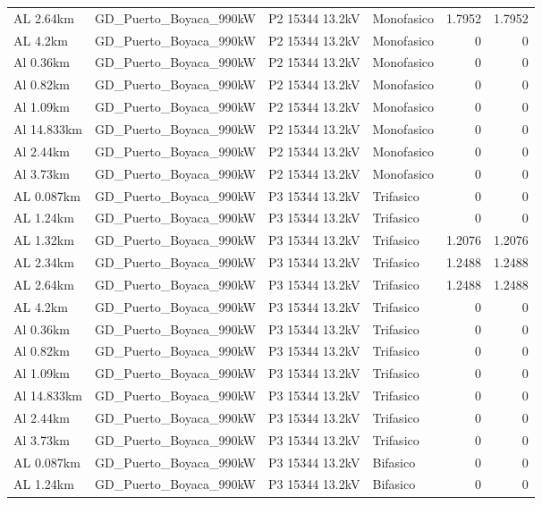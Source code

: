 \documentclass[11pt,a4paper]{article}
\begin{document}
\begin{longtable}{llllrr}
AL 2.64km & GD\_Puerto\_Boyaca\_990kW & P2 15344 13.2kV & Monofasico & 1.7952 & 1.7952 \\
AL 4.2km & GD\_Puerto\_Boyaca\_990kW & P2 15344 13.2kV & Monofasico & 0 & 0 \\
Al 0.36km & GD\_Puerto\_Boyaca\_990kW & P2 15344 13.2kV & Monofasico & 0 & 0 \\
Al 0.82km & GD\_Puerto\_Boyaca\_990kW & P2 15344 13.2kV & Monofasico & 0 & 0 \\
Al 1.09km & GD\_Puerto\_Boyaca\_990kW & P2 15344 13.2kV & Monofasico & 0 & 0 \\
Al 14.833km & GD\_Puerto\_Boyaca\_990kW & P2 15344 13.2kV & Monofasico & 0 & 0 \\
Al 2.44km & GD\_Puerto\_Boyaca\_990kW & P2 15344 13.2kV & Monofasico & 0 & 0 \\
Al 3.73km & GD\_Puerto\_Boyaca\_990kW & P2 15344 13.2kV & Monofasico & 0 & 0 \\
AL 0.087km & GD\_Puerto\_Boyaca\_990kW & P3 15344 13.2kV & Trifasico & 0 & 0 \\
AL 1.24km & GD\_Puerto\_Boyaca\_990kW & P3 15344 13.2kV & Trifasico & 0 & 0 \\
AL 1.32km & GD\_Puerto\_Boyaca\_990kW & P3 15344 13.2kV & Trifasico & 1.2076 & 1.2076 \\
AL 2.34km & GD\_Puerto\_Boyaca\_990kW & P3 15344 13.2kV & Trifasico & 1.2488 & 1.2488 \\
AL 2.64km & GD\_Puerto\_Boyaca\_990kW & P3 15344 13.2kV & Trifasico & 1.2488 & 1.2488 \\
AL 4.2km & GD\_Puerto\_Boyaca\_990kW & P3 15344 13.2kV & Trifasico & 0 & 0 \\
Al 0.36km & GD\_Puerto\_Boyaca\_990kW & P3 15344 13.2kV & Trifasico & 0 & 0 \\
Al 0.82km & GD\_Puerto\_Boyaca\_990kW & P3 15344 13.2kV & Trifasico & 0 & 0 \\
Al 1.09km & GD\_Puerto\_Boyaca\_990kW & P3 15344 13.2kV & Trifasico & 0 & 0 \\
Al 14.833km & GD\_Puerto\_Boyaca\_990kW & P3 15344 13.2kV & Trifasico & 0 & 0 \\
Al 2.44km & GD\_Puerto\_Boyaca\_990kW & P3 15344 13.2kV & Trifasico & 0 & 0 \\
Al 3.73km & GD\_Puerto\_Boyaca\_990kW & P3 15344 13.2kV & Trifasico & 0 & 0 \\
AL 0.087km & GD\_Puerto\_Boyaca\_990kW & P3 15344 13.2kV & Bifasico & 0 & 0 \\
AL 1.24km & GD\_Puerto\_Boyaca\_990kW & P3 15344 13.2kV & Bifasico & 0 & 0 \\

\end{longtable}
\end{document}
